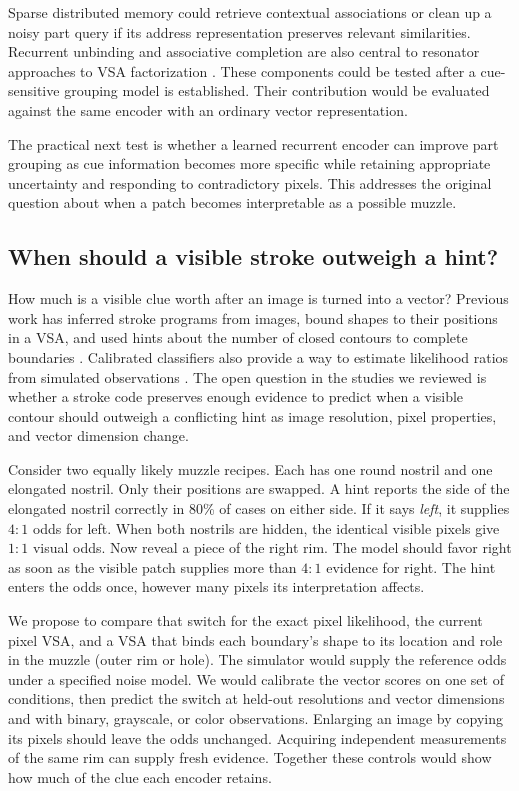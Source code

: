 \documentclass[11pt,letterpaper]{article}
\begin{document}
Sparse distributed memory could retrieve contextual associations or clean up a noisy part query if its address representation preserves relevant similarities. Recurrent unbinding and associative completion are also central to resonator approaches to VSA factorization \cite{frady2020}. These components could be tested after a cue-sensitive grouping model is established. Their contribution would be evaluated against the same encoder with an ordinary vector representation.

The practical next test is whether a learned recurrent encoder can improve part grouping as cue information becomes more specific while retaining appropriate uncertainty and responding to contradictory pixels. This addresses the original question about when a patch becomes interpretable as a possible muzzle.

\subsection{When should a visible stroke outweigh a hint?}
How much is a visible clue worth after an image is turned into a vector? Previous work has inferred stroke programs from images, bound shapes to their positions in a VSA, and used hints about the number of closed contours to complete boundaries \cite{feinman2021,renner2024,xu2013}. Calibrated classifiers also provide a way to estimate likelihood ratios from simulated observations \cite{cranmer2015}. The open question in the studies we reviewed is whether a stroke code preserves enough evidence to predict when a visible contour should outweigh a conflicting hint as image resolution, pixel properties, and vector dimension change.

Consider two equally likely muzzle recipes. Each has one round nostril and one elongated nostril. Only their positions are swapped. A hint reports the side of the elongated nostril correctly in 80\% of cases on either side. If it says \emph{left}, it supplies $4{:}1$ odds for left. When both nostrils are hidden, the identical visible pixels give $1{:}1$ visual odds. Now reveal a piece of the right rim. The model should favor right as soon as the visible patch supplies more than $4{:}1$ evidence for right. The hint enters the odds once, however many pixels its interpretation affects.

We propose to compare that switch for the exact pixel likelihood, the current pixel VSA, and a VSA that binds each boundary's shape to its location and role in the muzzle (outer rim or hole). The simulator would supply the reference odds under a specified noise model. We would calibrate the vector scores on one set of conditions, then predict the switch at held-out resolutions and vector dimensions and with binary, grayscale, or color observations. Enlarging an image by copying its pixels should leave the odds unchanged. Acquiring independent measurements of the same rim can supply fresh evidence. Together these controls would show how much of the clue each encoder retains.
\end{document}
